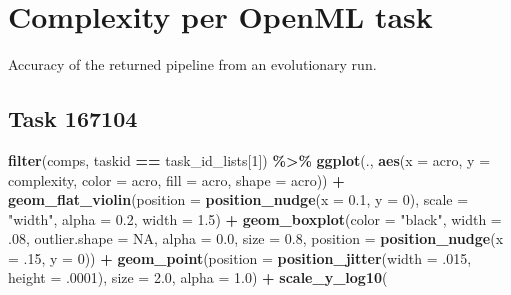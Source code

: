 \documentclass[
]{book}
\newenvironment{Shaded}{\begin{snugshade}}{\end{snugshade}}
\newcommand{\AttributeTok}[1]{\textcolor[rgb]{0.13,0.29,0.53}{#1}}
\newcommand{\ConstantTok}[1]{\textcolor[rgb]{0.56,0.35,0.01}{#1}}
\newcommand{\DecValTok}[1]{\textcolor[rgb]{0.00,0.00,0.81}{#1}}
\newcommand{\FloatTok}[1]{\textcolor[rgb]{0.00,0.00,0.81}{#1}}
\newcommand{\FunctionTok}[1]{\textcolor[rgb]{0.13,0.29,0.53}{\textbf{#1}}}
\newcommand{\NormalTok}[1]{#1}
\newcommand{\SpecialCharTok}[1]{\textcolor[rgb]{0.81,0.36,0.00}{\textbf{#1}}}
\newcommand{\StringTok}[1]{\textcolor[rgb]{0.31,0.60,0.02}{#1}}
\begin{document}
\hypertarget{complexity-per-openml-task}{%
\section{Complexity per OpenML task}\label{complexity-per-openml-task}}

Accuracy of the returned pipeline from an evolutionary run.

\hypertarget{task-167104-1}{%
\subsection{Task 167104}\label{task-167104-1}}

\begin{Shaded}
\begin{Highlighting}[]
\FunctionTok{filter}\NormalTok{(comps, taskid }\SpecialCharTok{==}\NormalTok{ task\_id\_lists[}\DecValTok{1}\NormalTok{]) }\SpecialCharTok{\%\textgreater{}\%}
  \FunctionTok{ggplot}\NormalTok{(., }\FunctionTok{aes}\NormalTok{(}\AttributeTok{x =}\NormalTok{ acro, }\AttributeTok{y =}\NormalTok{ complexity, }\AttributeTok{color =}\NormalTok{ acro,}
                \AttributeTok{fill =}\NormalTok{ acro, }\AttributeTok{shape =}\NormalTok{ acro)) }\SpecialCharTok{+}
  \FunctionTok{geom\_flat\_violin}\NormalTok{(}\AttributeTok{position =} \FunctionTok{position\_nudge}\NormalTok{(}\AttributeTok{x =} \FloatTok{0.1}\NormalTok{, }\AttributeTok{y =} \DecValTok{0}\NormalTok{),}
                   \AttributeTok{scale =} \StringTok{"width"}\NormalTok{, }\AttributeTok{alpha =} \FloatTok{0.2}\NormalTok{, }\AttributeTok{width =} \FloatTok{1.5}\NormalTok{) }\SpecialCharTok{+}
  \FunctionTok{geom\_boxplot}\NormalTok{(}\AttributeTok{color =} \StringTok{"black"}\NormalTok{, }\AttributeTok{width =}\NormalTok{ .}\DecValTok{08}\NormalTok{, }\AttributeTok{outlier.shape =} \ConstantTok{NA}\NormalTok{, }\AttributeTok{alpha =} \FloatTok{0.0}\NormalTok{,}
               \AttributeTok{size =} \FloatTok{0.8}\NormalTok{, }\AttributeTok{position =} \FunctionTok{position\_nudge}\NormalTok{(}\AttributeTok{x =}\NormalTok{ .}\DecValTok{15}\NormalTok{, }\AttributeTok{y =} \DecValTok{0}\NormalTok{)) }\SpecialCharTok{+}
  \FunctionTok{geom\_point}\NormalTok{(}\AttributeTok{position =} \FunctionTok{position\_jitter}\NormalTok{(}\AttributeTok{width =}\NormalTok{ .}\DecValTok{015}\NormalTok{, }\AttributeTok{height =}\NormalTok{ .}\DecValTok{0001}\NormalTok{),}
             \AttributeTok{size =} \FloatTok{2.0}\NormalTok{, }\AttributeTok{alpha =} \FloatTok{1.0}\NormalTok{) }\SpecialCharTok{+}
  \FunctionTok{scale\_y\_log10}\NormalTok{(}

\end{Highlighting}
\end{Shaded}
\end{document}
